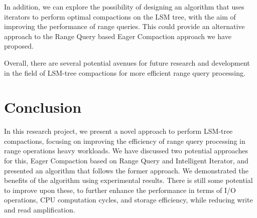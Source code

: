\documentclass[balance=false, sigconf]{acmart}
\begin{document}
In addition, we can explore the possibility of designing an algorithm that uses iterators to perform optimal compactions on the LSM tree, with the aim of improving the performance of range queries. This could provide an alternative approach to the Range Query based Eager Compaction approach we have proposed.

Overall, there are several potential avenues for future research and development in the field of LSM-tree compactions for more efficient range query processing.

\section{Conclusion}
 In this research project, we present a novel approach to perform LSM-tree compactions, focusing on improving the efficiency of range query processing in range operations heavy workloads. We have discussed two potential approaches for this, Eager Compaction based on Range Query and Intelligent Iterator, and presented an algorithm that follows the former approach. We demonstrated the benefits of the algorithm using experimental results. There is still some potential to improve upon these, to further enhance the performance in terms of I/O operations, CPU computation cycles, and storage efficiency, while reducing write and read amplification.

 
 
\end{document}
